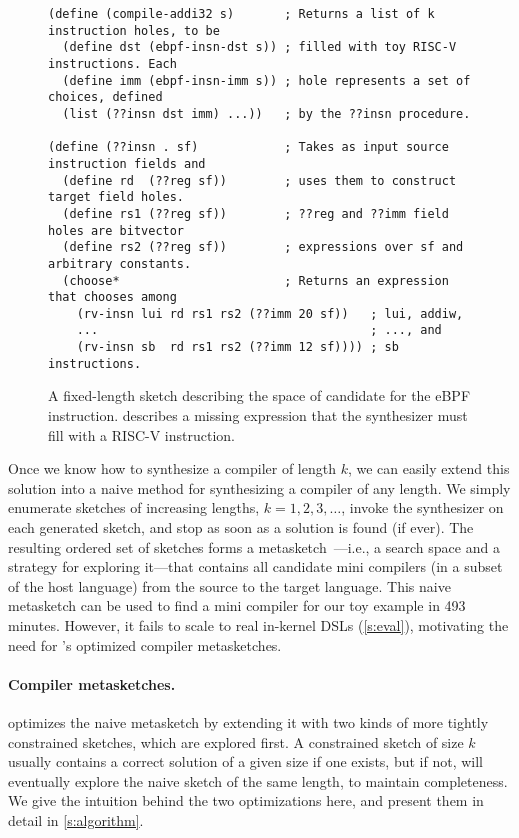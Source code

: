 \begin{figure}[h]
\begin{lstlisting}[language=rosette,xleftmargin=0em,mathescape=true]
(define (compile-addi32 s)       ; Returns a list of k instruction holes, to be 
  (define dst (ebpf-insn-dst s)) ; filled with toy RISC-V instructions. Each    
  (define imm (ebpf-insn-imm s)) ; hole represents a set of choices, defined 
  (list (??insn dst imm) ...))   ; by the ??insn procedure. 

(define (??insn . sf)            ; Takes as input source instruction fields and
  (define rd  (??reg sf))        ; uses them to construct target field holes. 
  (define rs1 (??reg sf))        ; ??reg and ??imm field holes are bitvector 
  (define rs2 (??reg sf))        ; expressions over sf and arbitrary constants.
  (choose*                       ; Returns an expression that chooses among  
    (rv-insn lui rd rs1 rs2 (??imm 20 sf))   ; lui, addiw,
    ...                                      ; ..., and
    (rv-insn sb  rd rs1 rs2 (??imm 12 sf)))) ; sb instructions.
\end{lstlisting}
\caption{A fixed-length sketch describing the space of candidate \minicompilers for
         the eBPF  instruction.  describes a missing
         expression that the synthesizer must fill with a RISC-V instruction.}
\label{fig:example-sketch}
\end{figure}

Once we know how to synthesize a compiler of length $k$, we can easily extend
this solution into a naive method for synthesizing a compiler of any length. We
simply enumerate sketches of increasing lengths, $k = 1, 2, 3, \ldots$, invoke
the synthesizer on each generated sketch, and stop as soon as a solution is
found (if ever). The resulting ordered set of sketches forms a
metasketch~\cite{bornholt:synapse}---i.e., a search space and a strategy for
exploring it---that contains all candidate mini compilers (in a subset of the
host language) from the source to the target language. This naive metasketch can
be used to find a mini compiler for our toy example in {493 minutes}. However,
it fails to scale to real in-kernel DSLs (\autoref{s:eval}), motivating the need
for \jitsynth's optimized compiler metasketches.\tighten

\paragraph{Compiler metasketches.} \jitsynth optimizes the naive metasketch by
extending it with two kinds of more tightly constrained sketches, which are
explored first. A constrained sketch of size $k$ usually contains a correct
solution of a given size if one exists, but if not, \jitsynth will eventually
explore the naive sketch of the same length, to maintain completeness. We give
the intuition behind the two optimizations here, and present them in detail in
\autoref{s:algorithm}. 

